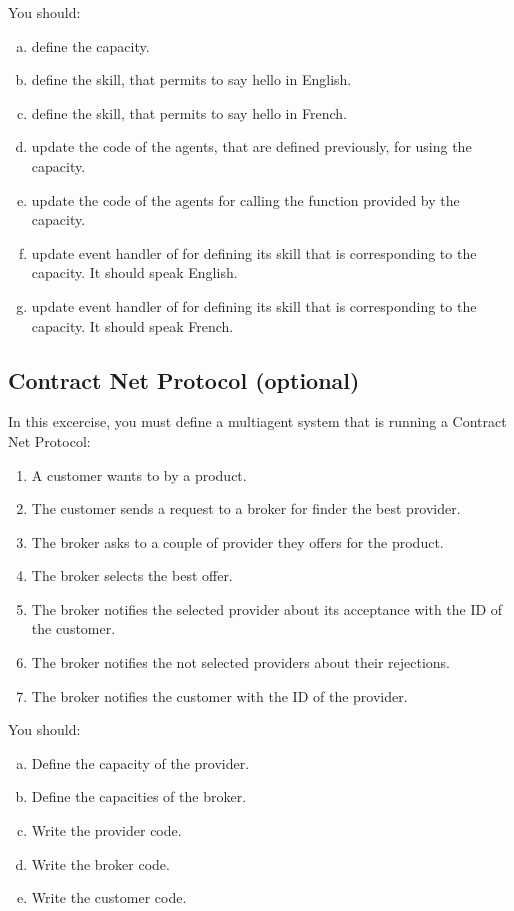\documentclass[article,english,nodocumentinfo]{multiagentfrreport}
\begin{document}
You should:
\begin{enumerate}[a)]
\item define the  capacity.
\item define the  skill, that permits to say hello in English.
\item define the  skill, that permits to say hello in French.
\item update the code of the agents, that are defined previously, for using the  capacity.
\item update the code of the agents for calling the function provided by the  capacity.
\item update  event handler of  for defining its skill that is corresponding to the  capacity. It should speak English.
\item update  event handler of  for defining its skill that is corresponding to the  capacity. It should speak French.
\end{enumerate}

\subsection{Contract Net Protocol (optional)}

In this excercise, you must define a multiagent system that is running a Contract Net Protocol:
\begin{enumerate}
\item A customer wants to by a product.
\item The customer sends a request to a broker for finder the best provider.
\item The broker asks to a couple of provider they offers for the product.
\item The broker selects the best offer.
\item The broker notifies the selected provider about its acceptance with the ID of the customer.
\item The broker notifies the not selected providers about their rejections.
\item The broker notifies the customer with the ID of the provider.
\end{enumerate}

You should:
\begin{enumerate}[a)]
\item Define the capacity of the provider.
\item Define the capacities of the broker.
\item Write the provider code.
\item Write the broker code.
\item Write the customer code.
\end{enumerate}
\end{document}
